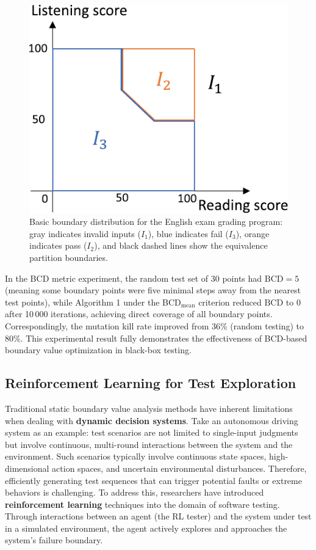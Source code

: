 \documentclass[manuscript,screen,review]{acmart}
\begin{document}
\begin{figure}[htb]
  \centering
  \includegraphics[width=0.5\linewidth]{./picture/1.pdf}
  \caption{Basic boundary distribution for the English exam grading program: gray indicates invalid inputs ($I_1$), blue indicates fail ($I_3$), orange indicates pass ($I_2$), and black dashed lines show the equivalence partition boundaries.}
  \label{fig:english_boundary}
\end{figure}

In the BCD metric experiment, the random test set of 30 points had $\mathrm{BCD} = 5$ (meaning some boundary points were five minimal steps away from the nearest test points), while Algorithm 1 under the BCD$_{\mathrm{mean}}$ criterion reduced $\mathrm{BCD}$ to 0 after 10\,000 iterations, achieving direct coverage of all boundary points. Correspondingly, the mutation kill rate improved from 36\% (random testing) to 80\%. This experimental result fully demonstrates the effectiveness of BCD-based boundary value optimization in black-box testing.
\subsection{Reinforcement Learning for Test Exploration}
Traditional static boundary value analysis methods have inherent limitations when dealing with \textbf{dynamic decision systems}. Take an autonomous driving system as an example: test scenarios are not limited to single-input judgments but involve continuous, multi-round interactions between the system and the environment. Such scenarios typically involve continuous state spaces, high-dimensional action spaces, and uncertain environmental disturbances. Therefore, efficiently generating test sequences that can trigger potential faults or extreme behaviors is challenging. To address this, researchers have introduced \textbf{reinforcement learning} techniques into the domain of software testing. Through interactions between an agent (the RL tester) and the system under test in a simulated environment, the agent actively explores and approaches the system’s failure boundary.
\end{document}
